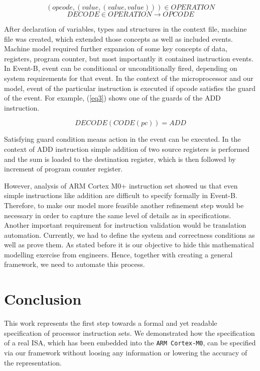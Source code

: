 \documentclass[conference]{IEEEtran}
\begin{document}
\begin{equation}
(opcode,(value, (value, value))) \in OPERATION
\label{eq1}
\end{equation}
\begin{equation}
DECODE \in OPERATION \rightarrow OPCODE
\label{eq2}
\end{equation}

After declaration of variables, types and structures in the context file, machine file was created, which
extended those concepts as well as included events. Machine model required further expansion of some key
concepts of data, registers, program counter, but most importantly it contained instruction events. In
Event-B, event can be conditional or unconditionally fired, depending on system requirements for that event.
In the context of the microprocessor and our model, event of the particular instruction is executed if
opcode satisfies the guard of the event. For example, (\ref{eq3}) shows one of the guards of the ADD
instruction.

\begin{equation}
DECODE(CODE(pc)) = ADD
\label{eq3}
\end{equation}

Satisfying guard condition means action in the event can be executed. In the context of ADD instruction
simple addition of two source registers is performed and the sum is loaded to the destination register,
which is then followed by increment of program counter register. 

However, analysis of ARM Cortex M0+ instruction set showed us that even simple instructions like addition
are difficult to specify formally in Event-B. Therefore, to make our model more feasible another refinement step would be
necessary in order to capture the same level of details as in specifications. Another important requirement
for instruction validation would be translation automation. Currently, we had to define the system and
correctness conditions as well as prove them. As stated before it is our objective to hide this mathematical
modelling exercise from engineers. Hence, together with creating a general framework, we need to automate
this process.


\section{Conclusion}
\label{sec:conclusion}
This work represents the first step towards a formal and yet readable specification of
processor instruction sets. We demonstrated how the specification of a real ISA, which has
been embedded into the \verb|ARM Cortex-M0|, can be specified via our framework without
loosing any information or lowering the accuracy of the representation.
\end{document}
